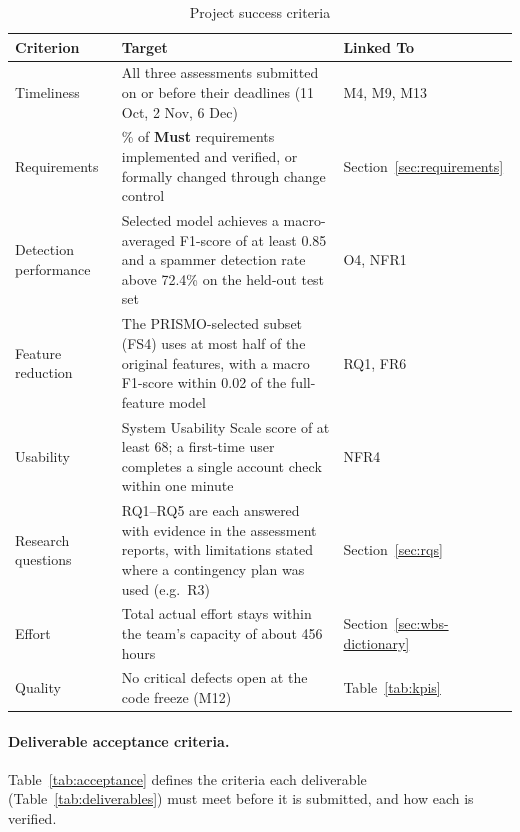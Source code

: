 \begin{table}[htbp]
\centering
\caption{Project success criteria}
\label{tab:success-criteria}
\begin{tabularx}{\textwidth}{@{}>{\raggedright\arraybackslash}p{} >{\raggedright\arraybackslash}X >{\raggedright\arraybackslash}p{}@{}}
  \toprule
  \textbf{Criterion} & \textbf{Target} & \textbf{Linked To} \\
  \midrule
  Timeliness & All three assessments submitted on or before their deadlines (11 Oct, 2 Nov, 6 Dec) & M4, M9, M13 \\
  Requirements & 100\% of \textbf{Must} requirements implemented and verified, or formally changed through change control & Section~\ref{sec:requirements} \\
  Detection performance & Selected model achieves a macro-averaged F1-score of at least 0.85 and a spammer detection rate above 72.4\% on the held-out test set & O4, NFR1 \\
  Feature reduction & The PRISMO-selected subset (FS4) uses at most half of the original features, with a macro F1-score within 0.02 of the full-feature model & RQ1, FR6 \\
  Usability & System Usability Scale score of at least 68; a first-time user completes a single account check within one minute & NFR4 \\
  Research questions & RQ1--RQ5 are each answered with evidence in the assessment reports, with limitations stated where a contingency plan was used (e.g.\ R3) & Section~\ref{sec:rqs} \\
  Effort & Total actual effort stays within the team's capacity of about 456 hours & Section~\ref{sec:wbs-dictionary} \\
  Quality & No critical defects open at the code freeze (M12) & Table~\ref{tab:kpis} \\
  \bottomrule
\end{tabularx}
\end{table}

\paragraph{Deliverable acceptance criteria.} Table~\ref{tab:acceptance} defines the criteria each deliverable (Table~\ref{tab:deliverables}) must meet before it is submitted, and how each is verified.

